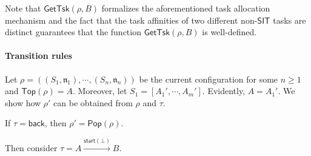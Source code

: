 \documentclass[preprint,12pt]{elsarticle}
\newcommand\Mm{{\mathcal{M} }}
\newcommand\lmd{{\sf Lmd}}
\newcommand{\AMASS}{\textsf{ASM}}
\newcommand{\LMAMASS}{\textsf{ASM}_\textsf{LM}}
\newcommand{\IFAMASS}{\textsf{ASM}_\textsf{IF}}
\newcommand\back{{\mathsf{back} }}
\newcommand\startactivity{{\mathsf{start} }}
\newcommand\aname{\mathfrak{n}}
\newcommand{\SIT}{\mathsf{SIT}}
\newcommand\topact{\mathsf{Top}}
\newcommand\push{\mathsf{Push}}
\newcommand\Pop{\mathsf{Pop}}
\newcommand\mvtsktop{\mathsf{MvTsk2Top}}
\newcommand\newtsk{\mathsf{NewTsk}}
\newcommand\gettsk{\mathsf{GetTsk}}
\begin{document}
Note that $\gettsk(\rho, B)$ formalizes the aforementioned task allocation mechanism and the fact that the task affinities of two different non-$\SIT$ tasks are distinct guarantees that the function $\gettsk(\rho, B)$ is well-defined. 
	
	


\smallskip

\paragraph{Transition rules} 


Let $\rho = ((S_1,\aname_1),\cdots,(S_n,\aname_n))$ be the current configuration for some $n \ge 1$ and $\topact(\rho) = A$. Moreover, let $S_1 = [A_1',\cdots,A_m']$. Evidently, $A = A_1'$. We show how $\rho'$ can be obtained from $\rho$ and $\tau$.
	
	If $\tau = \back$, then $\rho' = \Pop(\rho)$. 
	
	Then consider $\tau = A\xrightarrow{\startactivity(\bot)}B$.
	
	
	
	
	
	
\end{document}

